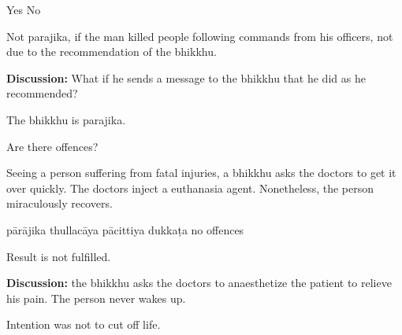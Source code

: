 \begin{exam}{\autoExamName}
\begin{problem*}
\begin{parts}
    \bigskip

    \begin{answers}{2}
      \bChoices
       Yes\eAns
       No\eAns
      \eChoices
    \end{answers}

    \bigskip

    \begin{solution}
      Not parajika, if the man killed people following commands from his officers, not due to the recommendation of the bhikkhu.
    \end{solution}

    \textbf{Discussion:} What if he sends a message to the bhikkhu that he did
    as he recommended?

    \begin{solution}
      The bhikkhu is parajika.
    \end{solution}

  \end{parts}

\end{problem*}

\begin{problem*}

  Are there offences?

\begin{parts}

  \item Seeing a person suffering from fatal injuries, a bhikkhu asks the doctors to
  get it over quickly. The doctors inject a euthanasia agent. Nonetheless, the person
  miraculously recovers.

  \bigskip

  \begin{answers}{5}
    \bChoices
     pārājika\eAns
     thullacāya\eAns
     pācittiya\eAns
     dukkaṭa\eAns
     no offences\eAns
    \eChoices
  \end{answers}

  \begin{solution}
    Result is not fulfilled.
  \end{solution}

  \bigskip

  \textbf{Discussion:} the bhikkhu asks the doctors to anaesthetize the patient to relieve his pain. The person never wakes up.

  \begin{solution}
    Intention was not to cut off life.
  \end{solution}


\end{parts}
\end{problem*}
\end{exam}
